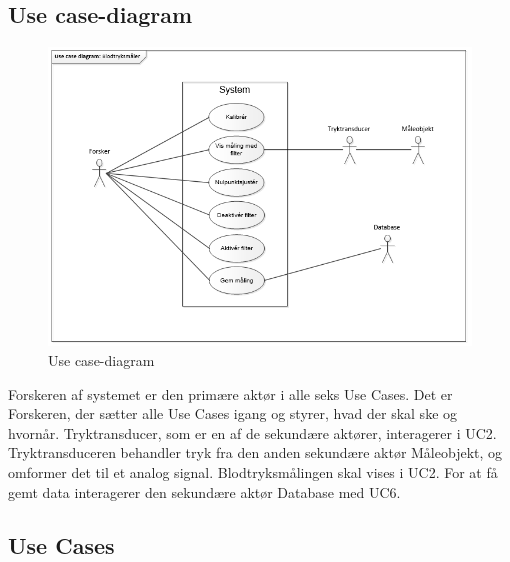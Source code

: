 \subsection{Use case-diagram}
\begin{figure}[H]
	\centering
	\includegraphics[width=1\textwidth]{Figurer/1}
	\caption{Use case-diagram}
	\label{fig:Use case-diagram}
\end{figure}

Forskeren af systemet er den primære aktør i alle seks Use Cases. Det er Forskeren, der sætter alle Use Cases igang og styrer, hvad der skal ske og hvornår. Tryktransducer, som er en af de sekundære aktører, interagerer i UC2. Tryktransduceren behandler tryk fra den anden sekundære aktør Måleobjekt, og omformer det til et analog signal. Blodtryksmålingen skal vises i UC2. For at få gemt data interagerer den sekundære aktør Database med UC6.  

\subsection{Use Cases}


